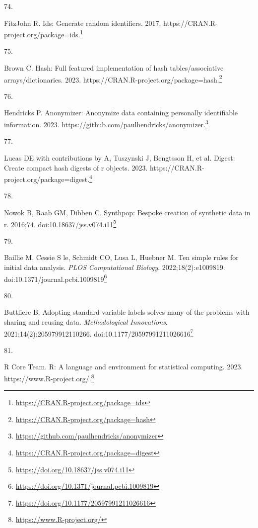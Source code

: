 \documentclass[
  a4paper,
]{book}
\newlength{\cslhangindent}
\newlength{\csllabelwidth}
\newlength{\cslentryspacingunit} %
\newenvironment{CSLReferences}[2] %
 {%
  \setlength{\parindent}{0pt}
  \ifodd #1
  \let\oldpar\par
  \def\par{\hangindent=\cslhangindent\oldpar}
  \fi
  \setlength{\parskip}{#2\cslentryspacingunit}
 }%
 {}
\newcommand{\CSLLeftMargin}[1]{\parbox[t]{\csllabelwidth}{#1}}
\newcommand{\CSLRightInline}[1]{\parbox[t]{\linewidth - \csllabelwidth}{#1}\break}
\renewcommand{\href}[2]{#2\footnote{\url{#1}}}
\begin{document}
\begin{CSLReferences}{0}{0}
\leavevmode{}%
\CSLLeftMargin{74. }%
\CSLRightInline{FitzJohn R. Ids: Generate random identifiers. 2017. \href{https://CRAN.R-project.org/package=ids}{https://CRAN.R-project.org/package=ids.}}

\leavevmode{}%
\CSLLeftMargin{75. }%
\CSLRightInline{Brown C. Hash: Full featured implementation of hash tables/associative arrays/dictionaries. 2023. \href{https://CRAN.R-project.org/package=hash}{https://CRAN.R-project.org/package=hash.}}

\leavevmode{}%
\CSLLeftMargin{76. }%
\CSLRightInline{Hendricks P. Anonymizer: Anonymize data containing personally identifiable information. 2023. \href{https://github.com/paulhendricks/anonymizer}{https://github.com/paulhendricks/anonymizer.}}

\leavevmode{}%
\CSLLeftMargin{77. }%
\CSLRightInline{Lucas DE with contributions by A, Tuszynski J, Bengtsson H, et al. Digest: Create compact hash digests of r objects. 2023. \href{https://CRAN.R-project.org/package=digest}{https://CRAN.R-project.org/package=digest.}}

\leavevmode{}%
\CSLLeftMargin{78. }%
\CSLRightInline{Nowok B, Raab GM, Dibben C. {\textbraceleft}Synthpop{\textbraceright}: Bespoke creation of synthetic data in {\textbraceleft}r{\textbraceright}. 2016;74. doi:\href{https://doi.org/10.18637/jss.v074.i11}{10.18637/jss.v074.i11}}

\leavevmode{}%
\CSLLeftMargin{79. }%
\CSLRightInline{Baillie M, Cessie S le, Schmidt CO, Lusa L, Huebner M. Ten simple rules for initial data analysis. \emph{PLOS Computational Biology}. 2022;18(2):e1009819. doi:\href{https://doi.org/10.1371/journal.pcbi.1009819}{10.1371/journal.pcbi.1009819}}

\leavevmode{}%
\CSLLeftMargin{80. }%
\CSLRightInline{Buttliere B. Adopting standard variable labels solves many of the problems with sharing and reusing data. \emph{Methodological Innovations}. 2021;14(2):205979912110266. doi:\href{https://doi.org/10.1177/20597991211026616}{10.1177/20597991211026616}}

\leavevmode{}%
\CSLLeftMargin{81. }%
\CSLRightInline{R Core Team. R: A language and environment for statistical computing. 2023. \href{https://www.R-project.org/}{https://www.R-project.org/.}}


\end{CSLReferences}
\end{document}
